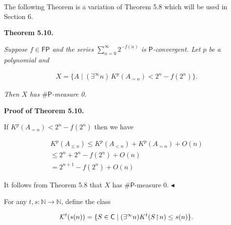 


The following Theorem is a variation of Theorem 5.8 which will be used in Section 6.\par





\par\medskip\noindent\textbf{
\textbf{Theorem 5.10}\textbf{.}
}\par



\emph{Suppose $f\in\mathsf{FP}$ and the series $\sum\limits_{n=0}^{\infty}2^{-f(n)}$ is $\mathsf{P}$-convergent.
Let $p$ be a polynomial and}\par


\[\begin{gathered}
X=\{A\mid(\exists^{\infty}n)\,K^{p}(A_{=n})<2^{n}-f(2^{n})\}.
\end{gathered}\]


\emph{Then $X$ has ${\mathsf{\#}\mathsf{P}}$-measure 0.}\par







\par\medskip\noindent\textbf{Proof of Theorem 5.10.}\par




If $K^{p}(A_{=n})<2^{n}-f(2^{n})$ then we have\par


\[\begin{gathered}
\displaystyle K^{p}(A_{\leq n}) \displaystyle\leq \displaystyle K^{p}(A_{<n})+K^{p}(A_{=n})+O(n) \\
\displaystyle\leq \displaystyle 2^{n}+2^{n}-f(2^{n})+O(n) \\
\displaystyle= \displaystyle 2^{n+1}-f(2^{n})+O(n)
\end{gathered}\]


It follows from Theorem 5.8 that $X$ has ${\mathsf{\#}\mathsf{P}}$-measure 0.
$\blacktriangleleft$\par




For any $t,s:\mathbb{N}\to\mathbb{N}$, define the class\par


\[\begin{gathered}
{\cal K}^{t}(s(n))=\{S\in\mathsf{C}\mid(\exists^{\infty}n)K^{t}(S\negthinspace\upharpoonright\negthinspace n)\leq s(n)\}.
\end{gathered}\]



